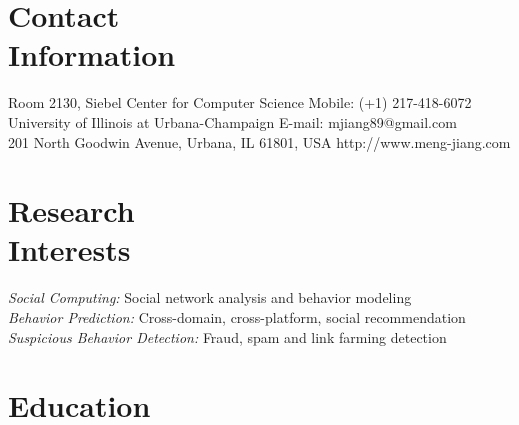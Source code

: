 \documentclass[margin, 10pt]{res} %
\begin{document}
\begin{resume}


\section{Contact \\ Information}

{Room 2130, Siebel Center for Computer Science} \hfill {Mobile:} {(+1) 217-418-6072} \\
{University of Illinois at Urbana-Champaign} \hfill {E-mail:} {mjiang89@gmail.com} \\
{201 North Goodwin Avenue, Urbana, IL 61801, USA} \hfill {http://www.meng-jiang.com}


\section{Research \\ Interests}

{\em Social Computing:} Social network analysis and behavior modeling \\
{\em Behavior Prediction:} Cross-domain, cross-platform, social recommendation \\
{\em Suspicious Behavior Detection:} Fraud, spam and link farming detection


\section{Education}


\end{resume}
\end{document}
